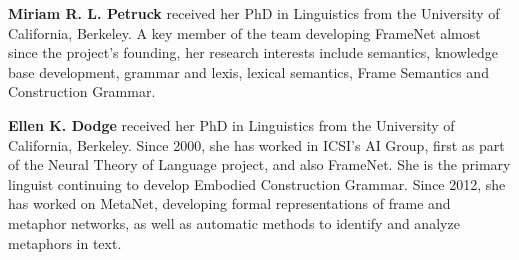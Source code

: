 \begin{bio}
{\bfseries Miriam R. L. Petruck} received her PhD in Linguistics from the University of California, Berkeley. A key member of the team developing FrameNet almost since the project's founding, her research interests include semantics, knowledge base development, grammar and lexis, lexical semantics, Frame Semantics and Construction Grammar.

{\bfseries Ellen K. Dodge} received her PhD in Linguistics from the University of California, Berkeley. Since 2000, she has worked in ICSI's AI Group, first as part of the Neural Theory of Language project, and also FrameNet. She is the primary linguist continuing to develop Embodied Construction Grammar. Since 2012, she has worked on MetaNet, developing formal representations of frame and metaphor networks, as well as automatic methods to identify and analyze metaphors in text.
\end{bio}

